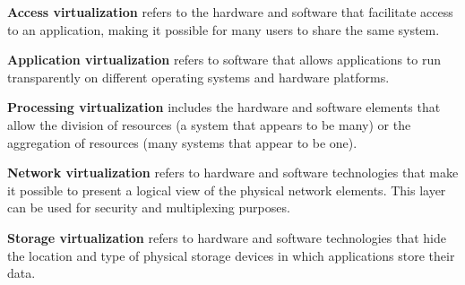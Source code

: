 
		
		
		
	
	\textbf{Access virtualization} refers to the hardware and software that facilitate access to an application, making it possible for many users to share the same system.
		
	\textbf{Application virtualization} refers to software that allows applications to run transparently on different operating systems and hardware platforms.
		
	\textbf{Processing virtualization} includes the hardware and software elements that allow the division of resources (a system that appears to be many) or the aggregation of resources (many systems that appear to be one).

	\textbf{Network virtualization} refers to hardware and software technologies that make it possible to present a logical view of the physical network elements. This layer can be used for security and multiplexing purposes.
		
	\textbf{Storage virtualization} refers to hardware and software technologies that hide the location and type of physical storage devices in which applications store their data.
		

